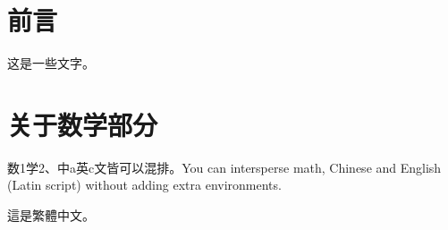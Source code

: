 \documentclass{article}
\begin{document}
\section{前言}
这是一些文字。

\section{关于数学部分}
数1学2、中a英c文皆可以混排。You can intersperse math, Chinese and English (Latin script) without adding extra environments.

這是繁體中文。
\end{document}
